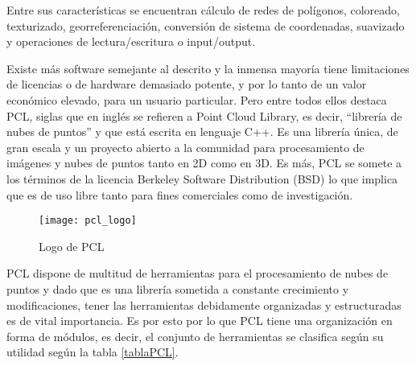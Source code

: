 Entre sus características se encuentran cálculo de redes de polígonos, coloreado, texturizado, georreferenciación, conversión de sistema de coordenadas, suavizado y operaciones de lectura/escritura o input/output.

Existe más software semejante al descrito y la inmensa mayoría tiene limitaciones de licencias o de hardware demasiado potente, y por lo tanto de un valor económico elevado, para un usuario particular. Pero entre todos ellos destaca PCL, siglas que en inglés se refieren a Point Cloud Library\cite{PCL}, es decir, ``librería de nubes de puntos'' y que está escrita en lenguaje C++. Es una librería única, de gran escala y un proyecto abierto a la comunidad para procesamiento de imágenes y nubes de puntos tanto en 2D como en 3D. Es más, PCL se somete a los términos de la licencia Berkeley Software Distribution (BSD) lo que implica que es de uso libre tanto para fines comerciales como de investigación. 

\begin{figure}
\centering
{}
  \texttt{[image: pcl\_logo]}
  \caption{Logo de PCL}\label{fig:pcl logo}
\endminipage\hfill
\end{figure}

PCL dispone de multitud de herramientas para el procesamiento de nubes de puntos y dado que es una librería sometida a constante crecimiento y modificaciones, tener las herramientas debidamente organizadas y estructuradas es de vital importancia. Es por esto por lo que PCL tiene una organización en forma de módulos\cite{PCL_modulos}, es decir, el conjunto de herramientas se clasifica según su utilidad según la tabla \ref{tablaPCL}.


